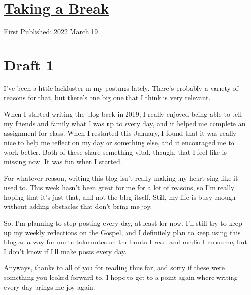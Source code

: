 \documentclass[12pt]{article}[titlepage]
\newcommand{\1}{\={a}}
\newcommand{\2}{\={e}}
\newcommand{\3}{\={\i}}
\newcommand{\4}{\=o}
\newcommand{\5}{\=u}
\newcommand{\6}{\={A}}
\renewcommand{\,}{\textsuperscript{,}}
\begin{document}
\doublespacing
\section{\href{taking-a-break.html}{Taking a Break}}
First Published: 2022 March 19

\section{Draft 1}
I've been a little lackluster in my postings lately.
There's probably a variety of reasons for that, but there's one big one that I think is very relevant.

When I started writing the blog back in 2019, I really enjoyed being able to tell my friends and family what I was up to every day, and it helped me complete an assignment for class.
When I restarted this January, I found that it was really nice to help me reflect on my day or something else, and it encouraged me to work better.
Both of these share something vital, though, that I feel like is missing now.
It was fun when I started.

For whatever reason, writing this blog isn't really making my heart sing like it used to.
This week hasn't been great for me for a lot of reasons, so I'm really hoping that it's just that, and not the blog itself.
Still, my life is busy enough without adding obstacles that don't bring me joy.

So, I'm planning to stop posting every day, at least for now.
I'll still try to keep up my weekly reflections on the Gospel, and I definitely plan to keep using this blog as a way for me to take notes on the books I read and media I consume, but I don't know if I'll make posts every day.

Anyways, thanks to all of you for reading thus far, and sorry if these were something you looked forward to.
I hope to get to a point again where writing every day brings me joy again.
\end{document}
